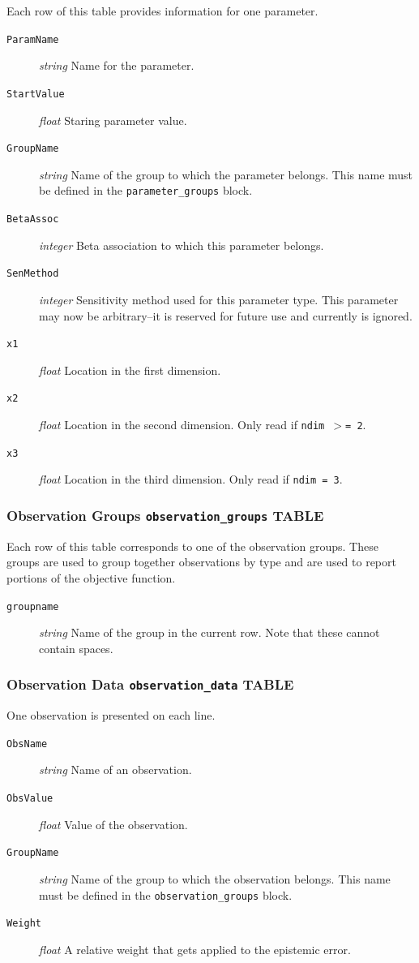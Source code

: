 \documentclass[11pt,oneside,onecolumn]{usgsreport}
\begin{document}
\begin{appendix}
Each row of this table provides information for one parameter.
\begin{description}
\item [{\texttt{ParamName}}] \emph{string} Name for the parameter.
\item [{\texttt{StartValue}}] \emph{float }Staring parameter value.
\item [{\texttt{GroupName}}] \emph{string} Name of the group to which the
parameter belongs. This name must be defined in the \texttt{parameter\_groups}
block.
\item [{\texttt{BetaAssoc}}] \emph{integer} Beta association to which this
parameter belongs.
\item [{\texttt{SenMethod}}] \emph{integer} Sensitivity method used for
this parameter type. This parameter may now be arbitrary--it is reserved
for future use and currently is ignored.
\item [{\texttt{x1}}] \emph{float} Location in the first dimension.
\item [{\texttt{x2}}] \emph{float} Location in the second dimension. Only
read if \texttt{ndim $>$= 2}.
\item [{\texttt{x3}}] \emph{float} Location in the third dimension. Only
read if \texttt{ndim = 3}.
\end{description}

\subsubsection{Observation Groups \texttt{observation\_groups} TABLE}

Each row of this table corresponds to one of the observation groups.
These groups are used to group together observations by type and are
used to report portions of the objective function.
\begin{description}
\item [{\texttt{groupname}}] \emph{string} Name of the group in the current
row. Note that these cannot contain spaces.
\end{description}

\subsubsection{Observation Data \texttt{observation\_data} TABLE}

One observation is presented on each line.
\begin{description}
\item [{\texttt{ObsName}}] \emph{string} Name of an observation.
\item [{\texttt{ObsValue}}] \emph{float} Value of the observation.
\item [{\texttt{GroupName}}] \emph{string} Name of the group to which the
observation belongs. This name must be defined in the \texttt{observation\_groups}
block. 
\item [{\texttt{Weight}}] \emph{float} A relative weight that gets applied
to the epistemic error.
\end{description}


\end{appendix}
\end{document}
